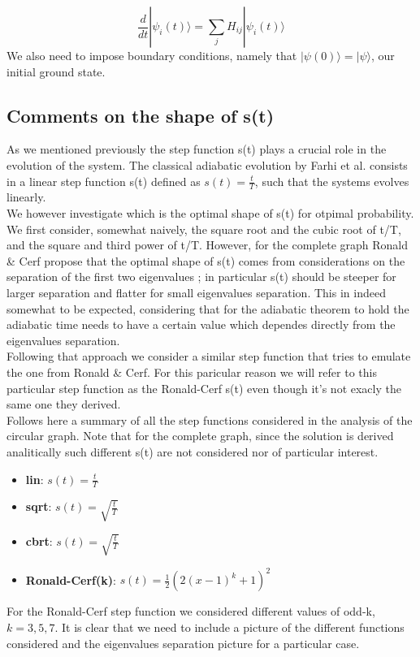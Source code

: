 \documentclass[11pt, twoside]{report}
\begin{document}
  \begin{equation}
  \frac{d}{dt}|\psi_i(t)\rangle = \sum_jH_{ij}|\psi_i(t)\rangle
  \end{equation}
We also need to impose boundary conditions, namely that $|\psi(0)\rangle = |\psi\rangle$, our initial ground state.

\subsection{Comments on the shape of s(t)}
As we mentioned previously the step function s(t) plays a crucial role in the evolution of the system. The classical adiabatic evolution by Farhi et al. \cite{Farhi2000} consists in a linear step function s(t) defined as $s(t) = \frac{t}{T}$, such that the systems evolves linearly. \\


We however investigate which is the optimal shape of s(t) for otpimal probability. We first consider, somewhat naively, the square root and the cubic root of t/T, and the square and third power of t/T. However, for the complete graph Ronald \& Cerf propose that the optimal shape of s(t) comes from considerations on the separation of the first two eigenvalues \cite{Roland2002}; in particular s(t) should be steeper for larger separation and flatter for small eigenvalues separation. This in indeed somewhat to be expected, considering that for the adiabatic theorem to hold the adiabatic time needs to have a certain value which dependes directly from the eigenvalues separation. \\
Following that approach we consider a similar step function that tries to emulate the one from Ronald \& Cerf. For this paricular reason we will refer to this particular step function as the Ronald-Cerf s(t) even though it's not exacly the same one they derived. \\


Follows here a summary of all the step functions considered in the analysis of the circular graph. Note that for the complete graph, since the solution is derived analitically such different s(t) are not considered nor of particular interest.
  \begin{itemize}
    \item \textbf{lin}: $s(t) = \frac{t}{T}$
    \item \textbf{sqrt}: $s(t) = \sqrt{\frac{t}{T}}$
    \item \textbf{cbrt}: $s(t) = \sqrt{\frac{t}{T}}$
    \item \textbf{Ronald-Cerf(k)}: $s(t) = \frac{1}{2}(2(x-1)^{k}+1)^2$
  \end{itemize}
For the Ronald-Cerf step function we considered different values of odd-k, $k=3,5,7$. It is clear that we need to include a picture of the different functions considered and the eigenvalues separation picture for a particular case.
\end{document}
